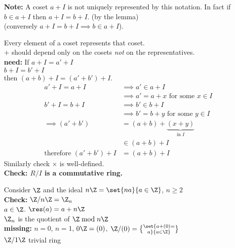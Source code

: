 \textbf{Note:} A coset $a+I$ is not uniquely represented by this notation.  In fact if $b\in a+I$ then $a+I=b+I$. (by the lemma) \\
(conversely $a+I=b+I\implies b\in a+I$).

Every element of a coset represents that coset. \\
$+$ should depend only on the cosets \emph{not} on the representatives. \\
\textbf{need:} If $a+I=a'+I$ \\
$b+I=b'+I$ \\
then $(a+b)+I=(a'+b')+I$. \\
\pf
\begin{align*}
a' + I = a + I &\implies a' \in a + I \\
&\implies a' = a + x \text{ for some $x\in I$} \\
b' + I = b + I &\implies b'\in b + I \\
&\implies b' = b + y \text{ for some $y\in I$} \\
\implies (a'+b') &= (a+b) + \underbrace{(x+y)}_\text{in $I$} \\
&\in (a+b) + I \\
\text{therefore } (a'+b')+I &= (a+b) + I
\end{align*}
Similarly check $\times$ is well-defined. \\
\textbf{Check: $R/I$ is a commutative ring.}

\ex Consider $\Z$ and the ideal $n\Z=\set{na}{a\in\Z}$, $n\geq2$ \\
\textbf{Check:} $\Z/n\Z=\Z_n$ \\
$a\in\Z$. $\res(a)=a+n\Z$ \\
$\Z_n$ is the quotient of $\Z \bmod n\Z$ \\
\textbf{missing:} $n=0$, $n=1$, $0\Z=(0)$, $\Z/(0)=\set{a+(0)=\brace a}{a\in\Z}$ \\
$\Z/1\Z$ trivial ring